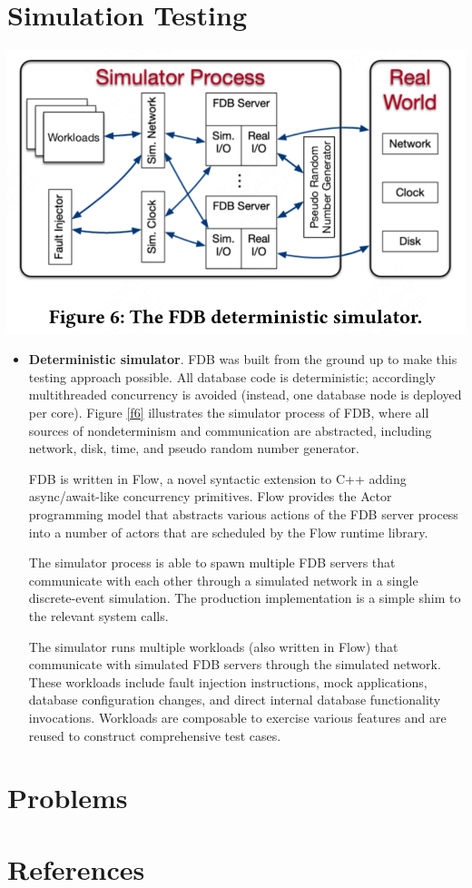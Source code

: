 \documentclass[11pt]{article}
\begin{document}
\section{Simulation Testing}
\label{sec:org1f668be}
\begin{center}
\includegraphics[width=.5\textwidth]{../../images/papers/114.png}
\label{f6}
\end{center}

\begin{itemize}
\item \textbf{Deterministic simulator}. FDB was built from the ground up to make this testing approach possible.
All database code is deterministic; accordingly multithreaded concurrency is avoided (instead, one
database node is deployed per core). Figure \ref{f6} illustrates the simulator process of FDB, where
all sources of nondeterminism and communication are abstracted, including network, disk, time, and
pseudo random number generator.

FDB is written in Flow, a novel syntactic extension to C++ adding async/await-like concurrency
primitives. Flow provides the Actor programming model that abstracts various actions of the FDB
server process into a number of actors that are scheduled by the Flow runtime library.

The simulator process is able to spawn multiple FDB servers that communicate with each other through
a simulated network in a single discrete-event simulation. The production implementation is a simple
shim to the relevant system calls.

The simulator runs multiple workloads (also written in Flow) that communicate with simulated FDB
servers through the simulated network. These workloads include fault injection instructions, mock
applications, database configuration changes, and direct internal database functionality
invocations. Workloads are composable to exercise various features and are reused to construct
comprehensive test cases.
\end{itemize}
\section{Problems}
\label{sec:org8b43421}


\section{References}
\label{sec:orge9068a7}
\label{bibliographystyle link}



\end{document}
